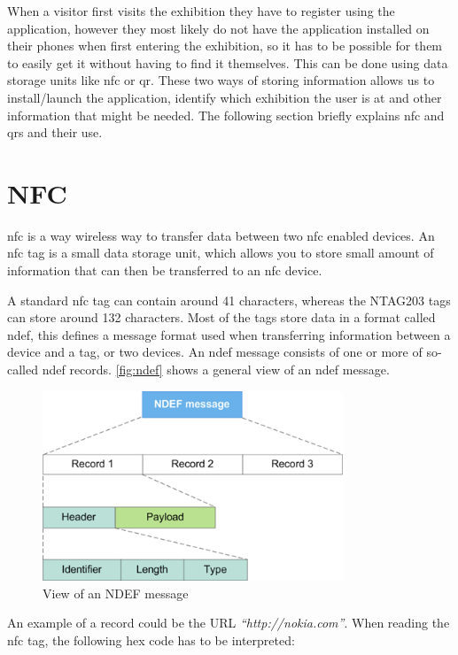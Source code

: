 When a visitor first visits the exhibition they have to register using the application, however they most likely do not have the application installed on their phones when first entering the exhibition, so it has to be possible for them to easily get it without having to find it themselves. This can be done using data storage units like \ac{nfc} or \ac{qr}. These two ways of storing information allows us to install/launch the application, identify which exhibition the user is at and other information that might be needed. The following section briefly explains \ac{nfc} and \ac{qr}s and their use. 

\section{NFC}
\ac{nfc} is a way wireless way to transfer data between two \ac{nfc} enabled devices. 
An \ac{nfc} tag is a small data storage unit, which allows you to store small amount of information that can then be transferred to an \ac{nfc} device. 

A standard \ac{nfc} tag can contain around 41 characters, whereas the NTAG203 tags can store around 132 characters\citep{nfccap}. Most of the tags store data in a format called \ac{ndef}, this defines a message format used when transferring information between a device and a tag, or two devices. An \ac{ndef} message consists of one or more of so-called \ac{ndef} records. \autoref{fig:ndef} shows a general view of an \ac{ndef} message.

\begin{figure}[H]
\centering
\includegraphics[width=0.8\textwidth]{img/nfcrecord.png}
\caption{View of an NDEF message\citep{ndef}}
\label{fig:ndef}
\end{figure}

An example of a record could be the URL \textit{``http://nokia.com''}. When reading the \ac{nfc} tag, the following hex code has to be interpreted: 

